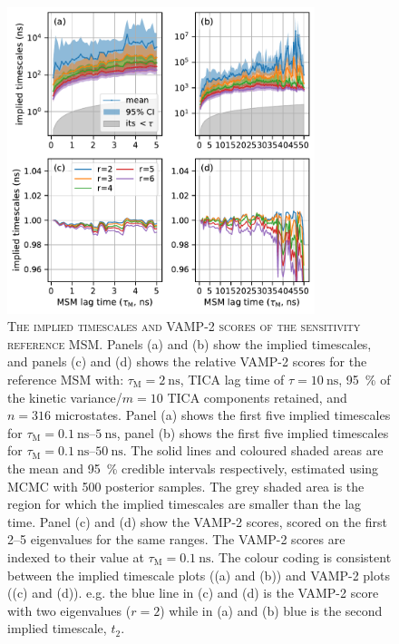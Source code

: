 \begin{figure}[ht!]
 \centering
 \includegraphics[width=0.8\textwidth]{chapters/aadh/figures/implied_timescales_D_sens.pdf}
\caption[The implied timescales and VAMP-2 scores of the sensitivity reference MSM]{\textsc{The implied timescales and VAMP-2 scores of the sensitivity reference MSM}. Panels (a) and (b) show the implied timescales, and panels (c) and (d) shows the relative VAMP-2 scores for the reference MSM with: $\tau_{\mathrm{M}}=\SI{2}{\nano\second}$, TICA lag time of $\tau=\SI{10}{\nano\second}$, \SI{95}{\percent} of the kinetic variance/$m=10$ TICA components retained, and $n=316$ microstates. Panel (a) shows the first five implied timescales for $\tau_{\mathrm{M}}=\SIrange[range-phrase=\text{--}]{0.1}{5}{\nano\second}$, panel (b) shows the first five implied timescales for $\tau_{\mathrm{M}} = \SIrange[range-phrase]{0.1}{50}{\nano\second}$. The solid lines and coloured shaded areas are the mean and \SI{95}{\percent} credible intervals respectively, estimated using MCMC with \num{500} posterior samples. The grey shaded area is the region for which the implied timescales are smaller than the lag time. Panel (c) and (d) show the VAMP-2 scores, scored on the first \numrange{2}{5} eigenvalues for the same ranges. The VAMP-2 scores are indexed to their value at $\tau_{\mathrm{M}}=\SI{0.1}{\nano\second}$. The colour coding is consistent between the implied timescale plots ((a) and (b)) and VAMP-2 plots ((c) and (d)). e.g. the blue line in (c) and (d) is the VAMP-2 score with two eigenvalues ($r=2$) while in (a) and (b) blue is the second implied timescale, $t_{2}$.}
 \label{fig:its_d_sens}
\end{figure}

